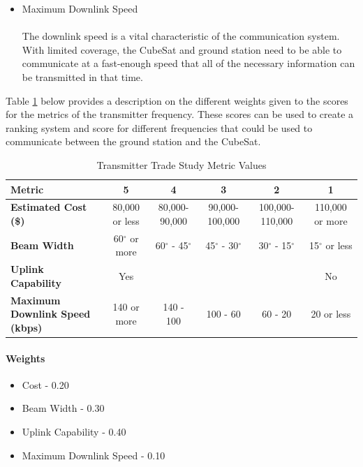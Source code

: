 \begin{itemize}
    \item Maximum Downlink Speed \\
    \\
The downlink speed is a vital characteristic of the communication system. With limited coverage, the CubeSat and ground station need to be able to communicate at a fast-enough speed that all of the necessary information can be transmitted in that time.
\end{itemize}

Table \ref{tbl:Transmitter_Metric_Scores} below provides a description on the different weights given to the scores for the metrics of the transmitter frequency. These scores can be used to create a ranking system and score for different frequencies that could be used to communicate between the ground station and the CubeSat. 

\begin{table}[H]
\centering
\begin{tabular}{|p{3.5cm}|c|c|c|c|c|}
\hline
    \textbf{Metric} & \textbf{5} & \textbf{4} & \textbf{3} & \textbf{2} & \textbf{1}
    \\
\hline
    \textbf{Estimated Cost (\$)} & 80,000 or less & 80,000-90,000 & 90,000-100,000 & 100,000-110,000 & 110,000 or more
    \\
\hline
    \textbf{Beam Width} & 60$^{\circ}$ or more & 60$^{\circ}$ - 45$^{\circ}$ & 45$^{\circ}$ - 30$^{\circ}$ & 30$^{\circ}$ - 15$^{\circ}$ & 15$^{\circ}$ or less

    \\
\hline
    \textbf{Uplink Capability} & Yes &  &  &  & No
    \\
\hline
    \textbf{Maximum Downlink Speed (kbps)} & 140 or more & 140 - 100 & 100 - 60 & 60 - 20 & 20 or less
    \\

\hline
\end{tabular}
\caption{Transmitter Trade Study Metric Values}
\label{tbl:Transmitter_Metric_Scores}
\end{table}

\paragraph{Weights}
\begin{itemize}
    \item Cost - 0.20
    \item Beam Width - 0.30
    \item Uplink Capability - 0.40
    \item Maximum Downlink Speed - 0.10
\end{itemize}

